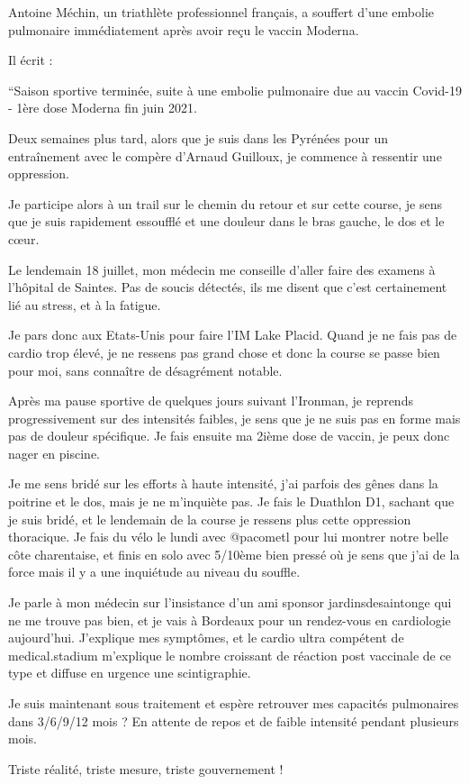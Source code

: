 Antoine Méchin, un triathlète professionnel français, a souffert d'une embolie
pulmonaire immédiatement après avoir reçu le vaccin Moderna.

Il écrit :

``Saison sportive terminée, suite à une embolie pulmonaire due au vaccin
Covid-19 - 1ère dose Moderna fin juin 2021.

Deux semaines plus tard, alors que je suis dans les Pyrénées pour un
entraînement avec le compère d'Arnaud Guilloux, je commence à ressentir une
oppression.

Je participe alors à un trail sur le chemin du retour et sur cette course, je
sens que je suis rapidement essoufflé et une douleur dans le bras gauche, le dos
et le cœur.

Le lendemain 18 juillet, mon médecin me conseille d'aller faire des examens à
l'hôpital de Saintes. Pas de soucis détectés, ils me disent que c'est
certainement lié au stress, et à la fatigue.

Je pars donc aux Etats-Unis pour faire l'IM Lake Placid. Quand je ne fais pas de
cardio trop élevé, je ne ressens pas grand chose et donc la course se passe bien
pour moi, sans connaître de désagrément notable.

Après ma pause sportive de quelques jours suivant l'Ironman, je reprends
progressivement sur des intensités faibles, je sens que je ne suis pas en forme
mais pas de douleur spécifique. Je fais ensuite ma 2ième dose de vaccin, je peux
donc nager en piscine.

Je me sens bridé sur les efforts à haute intensité, j'ai parfois des gênes dans
la poitrine et le dos, mais je ne m'inquiète pas. Je fais le Duathlon D1,
sachant que je suis bridé, et le lendemain de la course je ressens plus cette
oppression thoracique. Je fais du vélo le lundi avec @pacometl pour lui montrer
notre belle côte charentaise, et finis en solo avec 5/10ème bien pressé où je
sens que j'ai de la force mais il y a une inquiétude au niveau du souffle.

Je parle à mon médecin sur l'insistance d'un ami sponsor jardinsdesaintonge qui
ne me trouve pas bien, et je vais à Bordeaux pour un rendez-vous en cardiologie
aujourd'hui. J'explique mes symptômes, et le cardio ultra compétent de
medical.stadium m'explique le nombre croissant de réaction post vaccinale de ce
type et diffuse en urgence une scintigraphie.

Je suis maintenant sous traitement et espère retrouver mes capacités pulmonaires
dans 3/6/9/12 mois ? En attente de repos et de faible intensité pendant
plusieurs mois.

Triste réalité, triste mesure, triste gouvernement !
